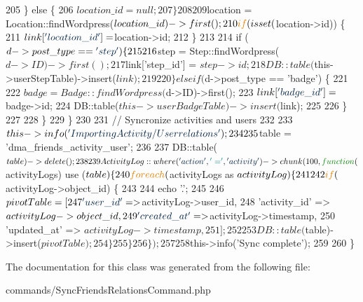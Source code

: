\begin{DoxyCode}
205                 \} \textcolor{keywordflow}{else} \{
206                     $location\_id = null;
207                 \}
208 
209                 $location = Location::findWordpress($location\_id)->first();
210                 \textcolor{keywordflow}{if} (isset($location->id)) \{
211                     $link[\textcolor{stringliteral}{'location\_id'}] = $location->id;
212                 \}
213 
214                 \textcolor{keywordflow}{if} ($d->post\_type == \textcolor{stringliteral}{'step'}) \{
215 
216                     $step = Step::findWordpress($d->ID)->first();
217                     $link[\textcolor{stringliteral}{'step\_id'}] = $step->id;
218                     DB::table($this->userStepTable)->insert($link);
219 
220                 \} elseif ($d->post\_type == \textcolor{stringliteral}{'badge'}) \{
221 
222                     $badge = Badge::findWordpress($d->ID)->first();
223                     $link[\textcolor{stringliteral}{'badge\_id'}] = $badge->id;
224                     DB::table($this->userBadgeTable)->insert($link);
225 
226                 \}
227         
228             \}
229         \}
230 
231         \textcolor{comment}{// Syncronize activities and users}
232 
233         $this->info(\textcolor{stringliteral}{'Importing Activity/User relations'});
234         
235         $table = \textcolor{stringliteral}{'dma\_friends\_activity\_user'};
236 
237         DB::table($table)->delete();
238 
239         ActivityLog::where(\textcolor{stringliteral}{'action'}, \textcolor{charliteral}{'='}, \textcolor{stringliteral}{'activity'})->chunk(100, \textcolor{keyword}{function}($activityLogs) use ($table) \{
240             \textcolor{keywordflow}{foreach} ($activityLogs as $activityLog) \{
241 
242                 \textcolor{keywordflow}{if} ($activityLog->object\_id) \{
243 
244                     echo \textcolor{stringliteral}{'.'};
245 
246                     $pivotTable = [
247                         \textcolor{stringliteral}{'user\_id'}       => $activityLog->user\_id,
248                         \textcolor{stringliteral}{'activity\_id'}   => $activityLog->object\_id,
249                         \textcolor{stringliteral}{'created\_at'}    => $activityLog->timestamp,
250                         \textcolor{stringliteral}{'updated\_at'}    => $activityLog->timestamp,
251                     ];
252 
253                     DB::table($table)->insert($pivotTable);
254                 \}
255             \}
256         \});
257 
258         $this->info(\textcolor{stringliteral}{'Sync complete'});
259 
260     \}
\end{DoxyCode}


The documentation for this class was generated from the following file\+:\begin{DoxyCompactItemize}
\item 
commands/Sync\+Friends\+Relations\+Command.\+php\end{DoxyCompactItemize}
